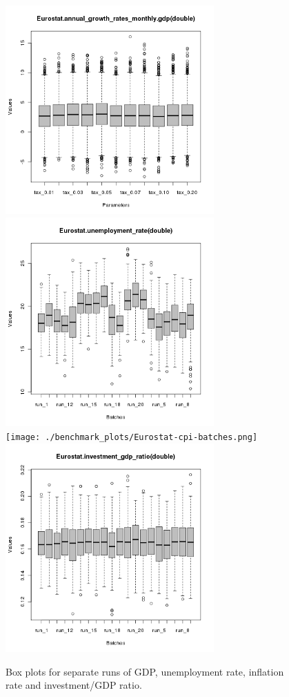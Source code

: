 \begin{figure}[ht!]
\centering\leavevmode
\begin{minipage}{17cm}
\centering\leavevmode
\includegraphics[width=8cm]{./benchmark_plots/Eurostat-annual_growth_rates_monthly-gdp-batches.png}
\includegraphics[width=8cm]{./benchmark_plots/Eurostat-unemployment_rate-batches.png}\\
\texttt{[image: ./benchmark\_plots/Eurostat-cpi-batches.png]}
\includegraphics[width=8cm]{./benchmark_plots/Eurostat-investment_gdp_ratio-batches.png}
\end{minipage}
\caption{Box plots for separate runs of GDP, unemployment rate, inflation rate and investment/GDP ratio.}
\label{Figure: run batch}
\end{figure}
